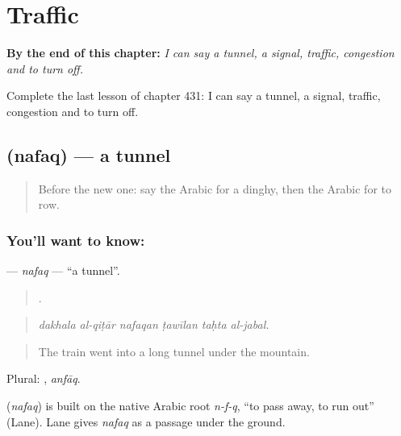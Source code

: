 
\chapter{Traffic}
\label{ch:ar-traffic}

\begin{chapteropening}
\textbf{By the end of this chapter:} \emph{I can say a tunnel, a signal, traffic, congestion and to turn off.}

Complete the last lesson of chapter 431: I can say a tunnel, a signal, traffic, congestion and to turn off.
\end{chapteropening}

\section[\texorpdfstring{\ar{نفق} (nafaq)}{نفق (nafaq)}]{ (nafaq) — a tunnel}

\label{lesson:AR-C431-nafaq}



\begin{quote}
Before the new one: say the Arabic for a dinghy, then the Arabic for to row.
\end{quote}

\subsection*{You'll want to know: }
\textbf{} — \emph{nafaq} — \textquotedblleft{}a tunnel\textquotedblright{}.

\begin{quote}
     .
\end{quote}

\begin{quote}
\emph{dakhala al-qiṭār nafaqan ṭawīlan taḥta al-jabal.}
\end{quote}

\begin{quote}
The train went into a long tunnel under the mountain.
\end{quote}

Plural: , \emph{anfāq}.

\begin{cousinweb}
\textbf{} (\emph{nafaq}) is built on the native Arabic root \emph{n-f-q}, \textquotedblleft{}to pass away, to run out\textquotedblright{} (Lane). Lane gives \emph{nafaq} as a passage under the ground.
\end{cousinweb}

